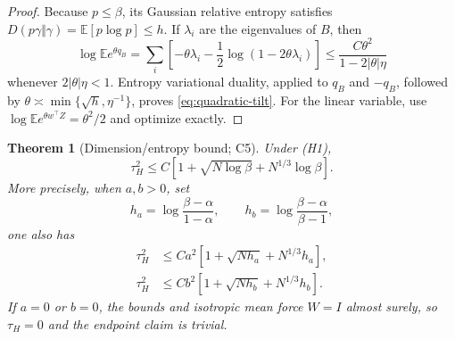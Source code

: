\documentclass[11pt]{article}
\numberwithin{equation}{section}
\newtheorem{theorem}{Theorem}[section]
\newcommand{\E}{\mathbb E}
\begin{document}
\begin{proof}
Because $p\le\beta$, its Gaussian relative entropy satisfies
$D(p\gamma\Vert\gamma)=\E[p\log p]\le h$.  If $\lambda_i$ are the
eigenvalues of $B$, then
\[
 \log\E e^{\theta q_B}
 =\sum_i\left[-\theta\lambda_i-\frac12\log(1-2\theta\lambda_i)\right]
 \le\frac{C\theta^2}{1-2|\theta|\eta}
\]
whenever $2|\theta|\eta<1$.  Entropy variational duality, applied to
$q_B$ and $-q_B$, followed by
$\theta\asymp\min\{\sqrt h,\eta^{-1}\}$, proves
\eqref{eq:quadratic-tilt}.  For the linear variable, use
$\log\E e^{\theta w^\top Z}=\theta^2/2$ and optimize exactly.
\end{proof}

\begin{theorem}[Dimension/entropy bound; C5]\label{thm:entropy}
Under (H1),
\begin{equation}\label{eq:entropy-tau}
 \tau_H^2\le
 C\left[1+\sqrt{N\log\beta}+N^{1/3}\log\beta\right].
\end{equation}
More precisely, when $a,b>0$, set
\begin{equation}\label{eq:shifted-h}
 h_a=\log\frac{\beta-\alpha}{1-\alpha},\qquad
 h_b=\log\frac{\beta-\alpha}{\beta-1},
\end{equation}
one also has
\begin{align}
 \tau_H^2&\le
 Ca^2[1+\sqrt{Nh_a}+N^{1/3}h_a],\label{eq:shifted-a-ent}\\
\tau_H^2&\le
 Cb^2[1+\sqrt{Nh_b}+N^{1/3}h_b].\label{eq:shifted-b-ent}
\end{align}
If $a=0$ or $b=0$, the bounds and isotropic mean force $W=I$ almost surely,
so $\tau_H=0$ and the endpoint claim is trivial.
\end{theorem}
\end{document}
